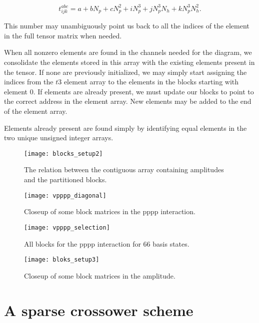 \begin{equation}
t^{abc}_{ijk} = a+ bN_p + cN_p^2 + iN_p^3 + jN_p^3 N_h+ kN_p^3 N_h^2.
\end{equation}

This number may unambiguously point us back to all the indices of the element in the full tensor matrix when needed.

When all nonzero elements are found in the channels needed for the diagram, we consolidate the elements stored in this array with the existing elements present in the tensor. If none are previously initialized, we may simply start assigning the indices from the $t3$ element array to the elements in the blocks starting with element 0. If elements are already present, we must update our blocks to point to the correct address in the element array. New elements may be added to the end of the element array.

Elements already present are found simply by identifying equal elements in the two unique unsigned integer arrays.

\begin{figure}[p]
    \centering
    \texttt{[image: blocks\_setup2]}
    \caption{The relation between the contiguous array containing amplitudes and the partitioned blocks.}
    \label{fig2}
\end{figure}


\begin{figure}[p]
    \centering
    \texttt{[image: vpppp\_diagonal]}
    \caption{Closeup of some block matrices in the pppp interaction.}
    \label{fig:vpppp_diagonal}
\end{figure}

\begin{figure}[p]
    \centering
    \texttt{[image: vpppp\_selection]}
    \caption{All blocks for the pppp interaction for 66 basis states.}
    \label{fig:vpppp_selection}
\end{figure}

\begin{figure}[p]
    \centering
    \texttt{[image: bloks\_setup3]}
    \caption{Closeup of some block matrices in the amplitude.}
    \label{fig:blocks_setup3}
\end{figure}


\section{A sparse crossower scheme}

